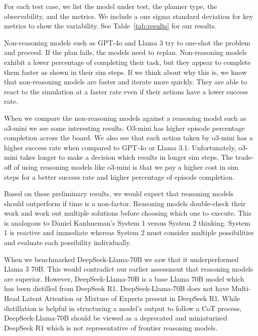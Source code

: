 For each test case, we list the model under test, the planner type, the observability, and the metrics.  We include a one sigma standard deviation for key metrics to show the variability.  See Table~\ref{tab:results} for our results.

Non-reasoning models such as GPT-4o and Llama 3 try to one-shot the problem and proceed.  If the plan fails, the models need to replan.  Non-reasoning models exhibit a lower percentage of completing their task, but they appear to complete them faster as shown in their sim steps.  If we think about why this is, we know that non-reasoning models are faster and iterate more quickly.  They are able to react to the simulation at a faster rate even if their actions have a lower success rate.

When we compare the non-reasoning models against a reasoning model such as o3-mini we see some interesting results.  O3-mini has higher episode percentage completion across the board.  We also see that each action taken by o3-mini has a higher success rate when compared to GPT-4o or Llama 3.1.  Unfortunately, o3-mini takes longer to make a decision which results in longer sim steps.  The trade-off of using reasoning models like o3-mini is that we pay a higher cost in sim steps for a better success rate and higher percentage of episode completion.

Based on these preliminary results, we would expect that reasoning models should outperform if time is a non-factor.  Reasoning models double-check their work and work out multiple solutions before choosing which one to execute.  This is analogous to Daniel Kanhneman's\cite{Kahneman:2011fj} System 1 versus System 2 thinking.  System 1 is reactive and immediate whereas System 2 must consider multiple possibilities and evaluate each possibility individually.

When we benchmarked DeepSeek-Llama-70B we saw that it underperformed Llama 3 70B.  This would contradict our earlier assessment that reasoning models are superior.  However, DeepSeek-Llama-70B is a base Llama 70B model which has been distilled from DeepSeek R1.  DeepSeek-Llama-70B does not have Multi-Head Latent Attention\cite{deepseekai2024deepseekv2strongeconomicalefficient} or Mixture of Experts\cite{dai2024deepseekmoeultimateexpertspecialization} present in DeepSeek R1.  While distillation is helpful in structuring a model's output to follow a CoT process, DeepSeek-Llama-70B should be viewed as a deprecated and miniaturized DeepSeek R1 which is not representative of frontier reasoning models.

